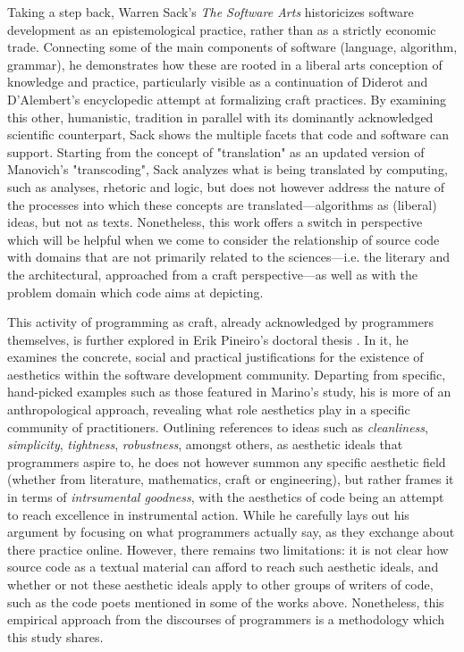 Taking a step back, Warren Sack's \emph{The Software Arts} \citep{sack_software_2019} historicizes software development as an epistemological practice, rather than as a strictly economic trade. Connecting some of the main components of software (language, algorithm, grammar), he demonstrates how these are rooted in a liberal arts conception of knowledge and practice, particularly visible as a continuation of Diderot and D'Alembert's encyclopedic attempt at formalizing craft practices. By examining this other, humanistic, tradition in parallel with its dominantly acknowledged scientific counterpart, Sack shows the multiple facets that code and software can support. Starting from the concept of "translation" as an updated version of Manovich's "transcoding", Sack analyzes what is being translated by computing, such as analyses, rhetoric and logic, but does not however address the nature of the processes into which these concepts are translated—algorithms as (liberal) ideas, but not as texts. Nonetheless, this work offers a switch in perspective which will be helpful when we come to consider the relationship of source code with domains that are not primarily related to the sciences—i.e. the literary and the architectural, approached from a craft perspective—as well as with the problem domain which code aims at depicting.

This activity of programming as craft, already acknowledged by programmers themselves, is further explored in Erik Pineiro's doctoral thesis \citep{pineiro_aesthetics_2003}. In it, he examines the concrete, social and practical justifications for the existence of aesthetics within the software development community. Departing from specific, hand-picked examples such as those featured in Marino's study, his is more of an anthropological approach, revealing what role aesthetics play in a specific community of practitioners. Outlining references to ideas such as \emph{cleanliness}, \emph{simplicity}, \emph{tightness}, \emph{robustness}, amongst others, as aesthetic ideals that programmers aspire to, he does not however summon any specific aesthetic field (whether from literature, mathematics, craft or engineering), but rather frames it in terms of \emph{intrsumental goodness}, with the aesthetics of code being an attempt to reach excellence in instrumental action. While he carefully lays out his argument by focusing on what programmers actually say, as they exchange about there practice online. However, there remains two limitations: it is not clear how source code as a textual material can afford to reach such aesthetic ideals, and whether or not these aesthetic ideals apply to other groups of writers of code, such as the code poets mentioned in some of the works above. Nonetheless, this empirical approach from the discourses of programmers is a methodology which this study shares.

